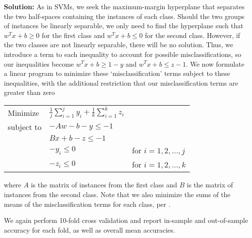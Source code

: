 \documentclass[11pt]{article}
\begin{document}
\begin{enumerate}
\textbf{Solution:} As in SVMs, we seek the maximum-margin hyperplane that separates the two half-spaces containing the instances of each class. Should the two groups of instances be linearly separable, we only need to find the hyperplane such that $w^\mathit{T}x + b \geq 0$ for the first class and $w^\mathit{T}x + b \leq 0$ for the second class. However, if the two classes are not linearly separable, there will be no solution. Thus, we introduce a term to each inequality to account for possible misclassifications, so our inequalities become $w^\mathit{T}x + b \geq 1 - y$ and $w^\mathit{T}x + b \leq z - 1$. We now formulate a linear program to minimize these `misclassification' terms subject to these inequalities, with the additional restriction that our misclassification terms are greater than zero

\begin{table}[h]
\begin{center}
\begin{tabular}{lll}
Minimize & $\frac{1}{j} \sum\limits_{i=1}^j y_i + \frac{1}{k} \sum\limits_{i=1}^k z_i$ & \\
subject to & $-Aw - b - y \leq -1$ & \\
 & $Bx + b - z \leq -1$ & \\
 & $-y_i \leq 0$ & for $i = 1,2,\ldots,j$ \\
 & $-z_i \leq 0$ & for $i = 1,2,\ldots,k$ \\
\end{tabular}
\end{center}
\end{table}

where $A$ is the matrix of instances from the first class and $B$ is the matrix of instances from the second class. Note that we also minimize the sums of the means of the misclassification terms for each class, per \cite{mangasarian}.

We again perform 10-fold cross validation and report in-sample and out-of-sample accuracy for each fold, as well as overall mean accuracies.


\end{enumerate}
\end{document}
